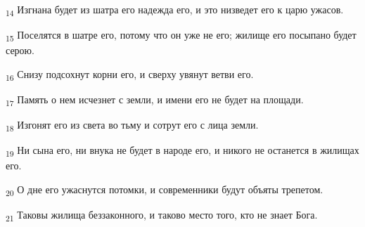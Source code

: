 \begin{tcolorbox}
\textsubscript{14} Изгнана будет из шатра его надежда его, и это низведет его к царю ужасов.
\end{tcolorbox}
\begin{tcolorbox}
\textsubscript{15} Поселятся в шатре его, потому что он уже не его; жилище его посыпано будет серою.
\end{tcolorbox}
\begin{tcolorbox}
\textsubscript{16} Снизу подсохнут корни его, и сверху увянут ветви его.
\end{tcolorbox}
\begin{tcolorbox}
\textsubscript{17} Память о нем исчезнет с земли, и имени его не будет на площади.
\end{tcolorbox}
\begin{tcolorbox}
\textsubscript{18} Изгонят его из света во тьму и сотрут его с лица земли.
\end{tcolorbox}
\begin{tcolorbox}
\textsubscript{19} Ни сына его, ни внука не будет в народе его, и никого не останется в жилищах его.
\end{tcolorbox}
\begin{tcolorbox}
\textsubscript{20} О дне его ужаснутся потомки, и современники будут объяты трепетом.
\end{tcolorbox}
\begin{tcolorbox}
\textsubscript{21} Таковы жилища беззаконного, и таково место того, кто не знает Бога.
\end{tcolorbox}
